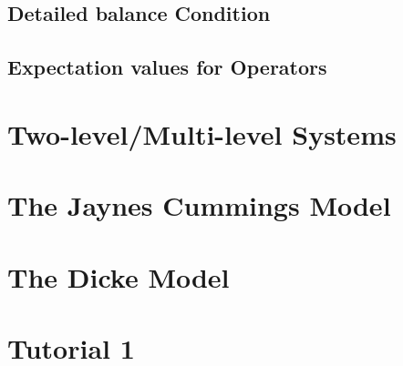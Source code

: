 \documentclass{scrartcl}
\newcommand{\1}{\mathbbm{1}}
\begin{document}
\subsection{Detailed balance Condition}
\subsection{Expectation values for Operators}
\section{Two-level/Multi-level Systems}
\section{The Jaynes Cummings Model}
\section{The Dicke Model}
\section{Tutorial 1}
\end{document}
